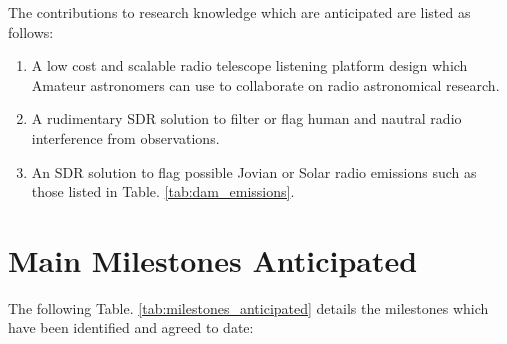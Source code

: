 \documentclass[runningheads,a4paper]{llncs}
\begin{document}
The contributions to research knowledge which are anticipated are listed as follows:

\begin{enumerate}
  \item A low cost and scalable radio telescope listening platform design which Amateur astronomers can use to collaborate on radio astronomical research.
  \item A rudimentary \gls{SDR} solution to filter or flag human and nautral radio interference from observations.
  \item An \gls{SDR} solution to flag possible Jovian or Solar radio emissions such as those listed in Table. \ref{tab:dam_emissions}.
\end{enumerate} 


%
%



%
%
\newpage
\section*{Main Milestones Anticipated}

The following Table. \ref{tab:milestones_anticipated} details the milestones which have been identified and agreed to date:
\end{document}
